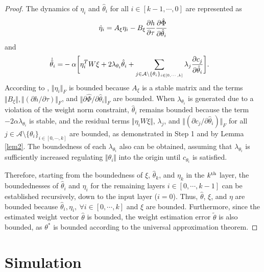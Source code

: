 \documentclass[lettersize,journal]{IEEEtran}
\begin{document}
\begin{proof}
The dynamics of $\eta_i$ and $\hat\theta_i$ for all $i\in [k-1,\cdots,0]$ are represented as
\begin{equation*}
    \dot\eta_i = 
    A_\xi\eta_i -B_\xi {\partial h\over\partial\tau}
    {\partial \hat\Phi\over \partial \hat\theta_i}
\end{equation*}
and
\begin{equation*}
    \begin{aligned}
        \dot{\hat\theta}_i 
        =&
        -\alpha 
        \bigg[
            \eta_i^TW\xi+2\lambda_{\theta_i} \hat\theta_i
            +
            \sum_{j\in\mathcal{A}\setminus \{\theta_i\}_{i\in[0,\cdots,k]}}\lambda_j{\partial c_j\over\partial \hat\theta_i}
        \bigg].
    \end{aligned}
\end{equation*}
According to \cite[Chap.~4 T.~1.9]{RN13}, $\Vert\eta_i\Vert_F$ is bounded because $A_\xi$ is a stable matrix and the terms $\Vert B_\xi\Vert, \Vert(\partial h/\partial \tau)\Vert_F$, and $\Vert\partial \hat\Phi/\partial\hat\theta_i\Vert_F$ are bounded.
When $\lambda_{\theta_i}$ is generated due to a violation of the weight norm constraint, $\hat\theta_i$ remains bounded because the term $-2\alpha\lambda_{\theta_i}$ is stable, and the residual terms $\Vert\eta_iW\xi\Vert$, $\lambda_j$, and $\Vert(\partial c_j/\partial \hat\theta_i)\Vert_F$ for all $j\in\mathcal{A}\setminus \{\theta_i\}_{i\in[0,\cdots,k]}$ are bounded, as demonstrated in Step 1 and by Lemma \ref{lem2}.
The boundedness of each $\lambda_{\theta_i}$ also can be obtained, assuming that $\lambda_{\theta_i}$ is sufficiently increased regulating $\Vert\theta_i\Vert$ into the origin until $c_{\theta_i}$ is satisfied.

Therefore, starting from the boundedness of $\xi$, $\hat\theta_k$, and $\eta_k$ in the $k\textsuperscript{th}$ layer, the boundednesses of $\hat\theta_i$ and $\eta_i$ for the remaining layers $i\in[0,\cdots,k-1]$ can be established recursively, down to the input layer ($i=0$). Thus, $\hat\theta$, $\xi$, and $\eta$ are bounded because $\hat\theta_i,\eta_i,\ \forall i\in[0,\cdots,k]$ and $\xi$ are bounded. Furthermore, since the estimated weight vector $\hat\theta$ is bounded, the weight estimation error $\tilde\theta$ is also bounded, as $\theta^*$ is bounded according to the universal approximation theorem.

\end{proof}

\section{Simulation}\label{sec:sim}
\end{document}
